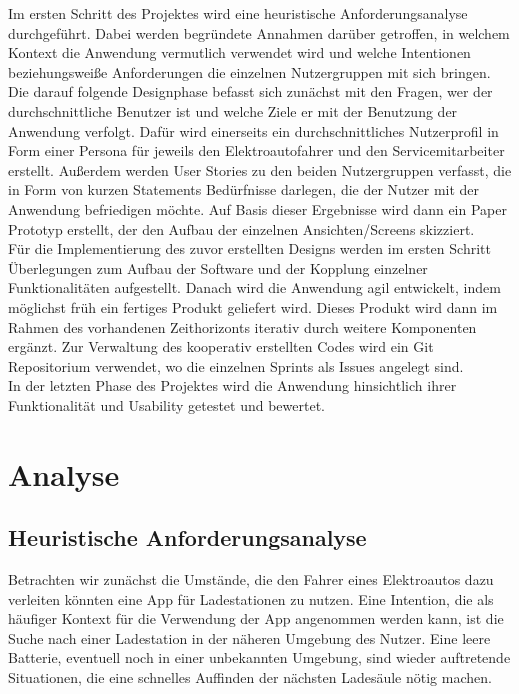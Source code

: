 \documentclass[12pt, a4paper, oneside]{article}
\begin{document}
Im ersten Schritt des Projektes wird eine heuristische Anforderungsanalyse durchgeführt. Dabei werden begründete Annahmen darüber getroffen, in welchem Kontext die Anwendung vermutlich verwendet wird und welche Intentionen beziehungsweiße Anforderungen die einzelnen Nutzergruppen mit sich bringen.\\

Die darauf folgende Designphase befasst sich zunächst mit den Fragen, wer der durchschnittliche Benutzer ist und welche Ziele er mit der Benutzung der Anwendung verfolgt. Dafür wird einerseits ein durchschnittliches Nutzerprofil in Form einer Persona für jeweils den Elektroautofahrer und den Servicemitarbeiter erstellt. Außerdem werden User Stories zu den beiden Nutzergruppen verfasst, die in Form von kurzen Statements Bedürfnisse darlegen, die der Nutzer mit der Anwendung befriedigen möchte. Auf Basis dieser Ergebnisse wird dann ein Paper Prototyp erstellt, der den Aufbau der einzelnen Ansichten/Screens skizziert.\\

Für die Implementierung des zuvor erstellten Designs werden im ersten Schritt Überlegungen zum Aufbau der Software und der Kopplung einzelner Funktionalitäten aufgestellt. Danach wird die Anwendung agil entwickelt, indem möglichst früh ein fertiges Produkt geliefert wird. Dieses Produkt wird dann im Rahmen des vorhandenen Zeithorizonts iterativ durch weitere Komponenten ergänzt. Zur Verwaltung des kooperativ erstellten Codes wird ein Git Repositorium verwendet, wo die einzelnen Sprints als Issues angelegt sind.\\

In der letzten Phase des Projektes wird die Anwendung hinsichtlich ihrer Funktionalität und Usability getestet und bewertet.\\

\section{Analyse}
\subsection{Heuristische Anforderungsanalyse}
Betrachten wir zunächst die Umstände, die den Fahrer eines Elektroautos dazu verleiten könnten eine App für Ladestationen zu nutzen. Eine Intention, die als häufiger Kontext für die Verwendung der App angenommen werden kann, ist die Suche nach einer Ladestation in der näheren Umgebung des Nutzer. Eine leere Batterie, eventuell noch in einer unbekannten Umgebung, sind wieder auftretende Situationen, die eine schnelles Auffinden der nächsten Ladesäule nötig machen.\\
\end{document}
